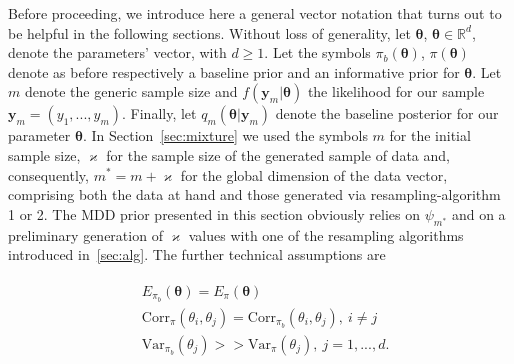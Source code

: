 \documentclass{statsoc}
\begin{document}
Before proceeding, we introduce here a general vector notation that turns out to be helpful in the following sections. Without loss of generality, let $\bm{\theta}$, $\bm{\theta} \in \mathbb{R}^{d}$, denote the parameters' vector, with $d \ge1$. Let the symbols  $\pi_{b}(\bm{\theta})$, $\pi(\bm{\theta})$  denote as before respectively  a baseline prior and an informative prior for $\bm{\theta}$. Let $m$ denote the generic sample size and $f( \bm{y}_{m}|\bm{\theta})$ the likelihood for our sample $\bm{y}_{m}=(y_{1},...,y_{m})$. Finally, let $q_{m}(\bm{\theta}|\bm{y}_{m})$ denote the baseline posterior for our parameter $\bm{\theta}$. In Section~\ref{sec:mixture} we used the symbols $m$ for the initial sample size, $\varkappa$ for the sample size of the generated sample of data and, consequently, $m^{*}=m+\varkappa$ for the global dimension of the data vector, comprising both the data at hand and those generated via resampling-algorithm 1 or 2. The MDD prior presented in this section obviously relies on $\psi_{m^{*}}$ and on a preliminary generation of $\varkappa$ values with one of the resampling algorithms introduced in~\ref{sec:alg}. The further technical assumptions are

\begin{align}
\begin{split}
 &E_{\pi_{b}}(\bm{\theta})=E_{\pi}(\bm{\theta})\\ 
& \mbox{Corr}_{\pi}(\theta_{i}, \theta_{j})= \mbox{Corr}_{\pi_{b}}(\theta_{i}, \theta_{j}), \  i \ne j \\
 & \mbox{Var}_{\pi_{b}}(\theta_{j})  >> \mbox{Var}_{\pi}(\theta_{j}), \ j=1,...,d.
  \end{split}
 \label{eq:assumption}
 \end{align}
\end{document}

